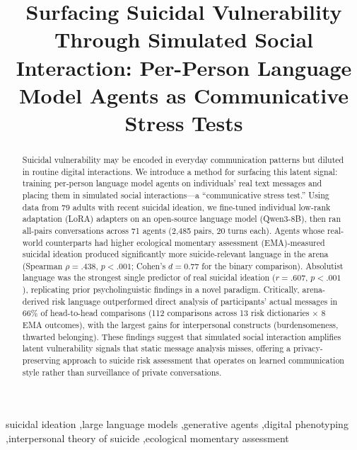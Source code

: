 \documentclass[review,12pt,authoryear]{elsarticle}
\begin{document}
\begin{frontmatter}

\title{Surfacing Suicidal Vulnerability Through Simulated Social Interaction: Per-Person Language Model Agents as Communicative Stress Tests}


\begin{abstract}
Suicidal vulnerability may be encoded in everyday communication patterns but diluted in routine digital interactions. We introduce a method for surfacing this latent signal: training per-person language model agents on individuals' real text messages and placing them in simulated social interactions---a ``communicative stress test.'' Using data from 79 adults with recent suicidal ideation, we fine-tuned individual low-rank adaptation (LoRA) adapters on an open-source language model (Qwen3-8B), then ran all-pairs conversations across 71 agents (2,485 pairs, 20 turns each). Agents whose real-world counterparts had higher ecological momentary assessment (EMA)-measured suicidal ideation produced significantly more suicide-relevant language in the arena (Spearman $\rho = .438$, $p < .001$; Cohen's $d = 0.77$ for the binary comparison). Absolutist language was the strongest single predictor of real suicidal ideation ($r = .607$, $p < .001$), replicating prior psycholinguistic findings in a novel paradigm. Critically, arena-derived risk language outperformed direct analysis of participants' actual messages in 66\% of head-to-head comparisons (112 comparisons across 13 risk dictionaries $\times$ 8 EMA outcomes), with the largest gains for interpersonal constructs (burdensomeness, thwarted belonging). These findings suggest that simulated social interaction amplifies latent vulnerability signals that static message analysis misses, offering a privacy-preserving approach to suicide risk assessment that operates on learned communication style rather than surveillance of private conversations.
\end{abstract}

\begin{keyword}
suicidal ideation \sep large language models \sep generative agents \sep digital phenotyping \sep interpersonal theory of suicide \sep ecological momentary assessment
\end{keyword}

\end{frontmatter}
\end{document}
